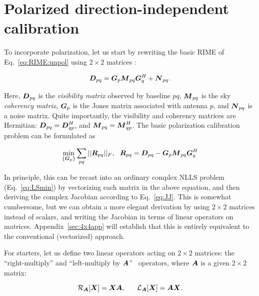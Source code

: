 \documentclass[useAMS,usenatbib]{mn2e}
\newcommand{\mat}[1]{{\bmath{#1}}}
\newcommand{\DD}{\mat{D}}
\newcommand{\MM}{\mat{M}}
\newcommand{\RR}{\mat{R}}
\newcommand{\GG}{\mat{G}}
\begin{document}
\section{Polarized direction-independent calibration}
\label{sec:pol:DI}

To incorporate polarization, let us start by rewriting the basic RIME of Eq.~\ref{eq:RIME:unpol} using $2\times 2$ matrices \citep[a full derivation
may be found in][]{RRIME1}:

\begin{equation}
\label{eq:RIME:pol}
\DD_{pq} = \GG_p \MM_{pq} \GG^H_q + \mat{N}_{pq}.
\end{equation}

Here, $\DD_{pq}$ is the \emph{visibility matrix} observed by baseline $pq$, $\MM_{pq}$ is the sky \emph{coherency matrix}, $\GG_p$ is the Jones matrix associated with antenna $p$, and $\mat{N}_{pq}$ is a noise matrix. Quite importantly, the visibility and coherency matrices are Hermitian: 
$\DD_{pq}=\DD^H_{qp}$, and $\MM_{pq}=\MM^H_{qp}$. The basic polarization calibration problem can be formulated as

\begin{equation}
\label{eq:cal:DI:pol}
\min_{\{\GG_p\}}\sum_{pq}||\RR_{pq}||_F,~~
\RR_{pq} = \DD_{pq}-\GG_p \MM_{pq} \GG^H_q
\end{equation}


\newcommand{\Rop}[1]{\mathcal{R}_{{#1}}}
\newcommand{\Lop}[1]{\mathcal{L}_{{#1}}}
\newcommand{\Top}{\mathcal{T}}

In principle, this can be recast into an ordinary complex NLLS problem (Eq.~\ref{eq:LSmin}) by vectorizing each matrix in the above equation, 
and then deriving the complex Jacobian according to Eq.~\ref{eq:JJ}. This is somewhat cumbersome, but we can obtain a more elegant derivation
by using $2\times2$ matrices instead of scalars, and writing the Jacobian in terms of linear operators on matrices. Appendix~\ref{sec:4x4app}
will establish that this is entirely equivalent to the conventional (vectorized) approach. 

For starters, let us define two linear operators acting on $2\times2$ matrices: the ``right-multiply'' and ``left-multiply by $\mat{A}$'' \
operators, where $\mat{A}$ is a given $2\times2$ matrix:

\begin{equation}
\label{eq:def::RL}
\Rop{\mat{A}} [\mat{X}] = \mat{XA}, ~~~~~
\Lop{\mat{A}} [\mat{X}] = \mat{AX}.
\end{equation}
\end{document}

